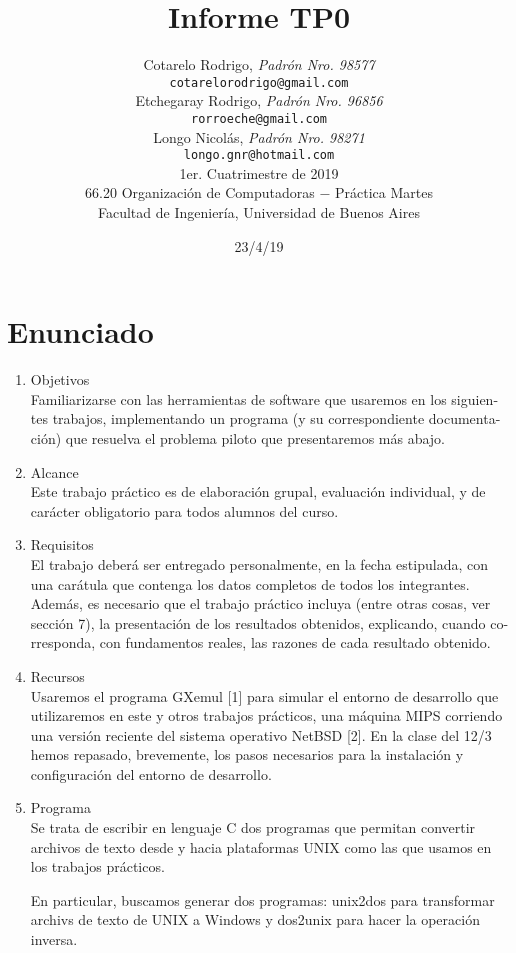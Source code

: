 \documentclass[a4paper,11pt]{article}
\title{		\textbf{Informe TP0}}
\author{	Cotarelo Rodrigo, \textit{Padrón Nro. 98577}                     \\
            \texttt{ cotarelorodrigo@gmail.com }                                              \\[2.5ex]
            Etchegaray Rodrigo, \textit{Padrón Nro. 96856}                     \\
            \texttt{ rorroeche@gmail.com }                                              \\[2.5ex]
			Longo Nicolás, \textit{Padrón Nro. 98271}                    
\\
            \texttt{ longo.gnr@hotmail.com }                                              \\[2.5ex]
            \normalsize{1er. Cuatrimestre de 2019}                                      \\
            \normalsize{66.20 Organización de Computadoras  $-$ Práctica Martes}  \\
            \normalsize{Facultad de Ingeniería, Universidad de Buenos Aires}            \\
       }
\date{23/4/19}
\begin{document}
\maketitle
\thispagestyle{empty}   %
\newpage

\section{Enunciado}

\begin{enumerate}
\item Objetivos \\
Familiarizarse con las herramientas de software que usaremos en los siguien-
tes trabajos, implementando un programa (y su correspondiente documenta-
ción) que resuelva el problema piloto que presentaremos más abajo.

\item Alcance \\
Este trabajo práctico es de elaboración grupal, evaluación individual, y de
carácter obligatorio para todos alumnos del curso.

\item Requisitos \\
El trabajo deberá ser entregado personalmente, en la fecha estipulada, con
una carátula que contenga los datos completos de todos los integrantes.
Además, es necesario que el trabajo práctico incluya (entre otras cosas, ver
sección 7), la presentación de los resultados obtenidos, explicando, cuando co-
rresponda, con fundamentos reales, las razones de cada resultado obtenido.

\item Recursos \\
Usaremos el programa GXemul [1] para simular el entorno de desarrollo que
utilizaremos en este y otros trabajos prácticos, una máquina MIPS corriendo
una versión reciente del sistema operativo NetBSD [2].
En la clase del 12/3 hemos repasado, brevemente, los pasos necesarios para
la instalación y configuración del entorno de desarrollo.

\item Programa \\
Se trata de escribir en lenguaje C dos programas que permitan convertir
archivos de texto desde y hacia plataformas UNIX como las que usamos en los
trabajos prácticos. 


\indent
En particular, buscamos generar dos programas: unix2dos para transformar archivs de texto de UNIX a Windows y dos2unix para hacer la operación inversa.



\end{enumerate}
\end{document}
